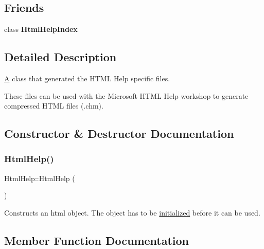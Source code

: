 \subsection*{Friends}
\begin{DoxyCompactItemize}
\item 
\mbox{\label{class_html_help_a6ba39d6a831c897c93a68738d9a721f3}} 
class {\bfseries Html\+Help\+Index}
\end{DoxyCompactItemize}


\subsection{Detailed Description}
\mbox{\hyperlink{class_a}{A}} class that generated the H\+T\+ML Help specific files.

These files can be used with the Microsoft H\+T\+ML Help workshop to generate compressed H\+T\+ML files (.chm). 

\subsection{Constructor \& Destructor Documentation}
\mbox{\label{class_html_help_a0d86f84971a446fc8c61c1a64f8eaaf8}} 
\subsubsection{\texorpdfstring{HtmlHelp()}{HtmlHelp()}}
{\footnotesize\ttfamily Html\+Help\+::\+Html\+Help (\begin{DoxyParamCaption}{ }\end{DoxyParamCaption})}

Constructs an html object. The object has to be \mbox{\hyperlink{class_html_help_acf6cb7c477c71f2031b5831f979991d5}{initialized}} before it can be used. 

\subsection{Member Function Documentation}
\mbox{\label{class_html_help_a254ac391f0b096f1c06b72205fca5d77}} 
